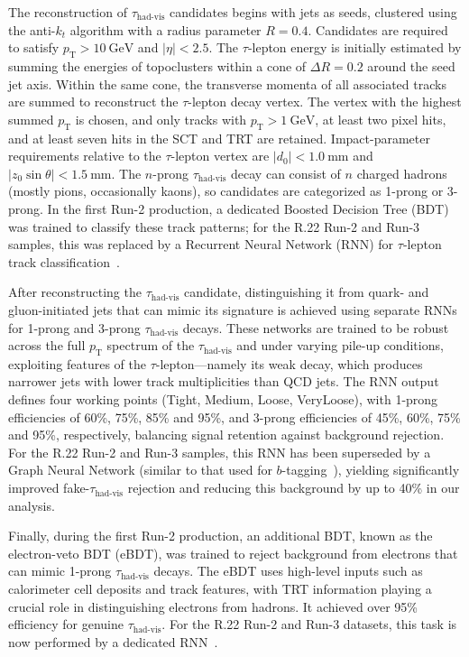 The reconstruction of \(\tau_{\text{had-vis}}\) candidates begins with jets as seeds, clustered using the anti-\(k_{t}\) algorithm with a radius parameter \(R = 0.4\).  Candidates are required to satisfy \(p_{\text{T}} > 10\ \mathrm{GeV}\) and \(|\eta| < 2.5\).  The \(\tau\)-lepton energy is initially estimated by summing the energies of topoclusters within a cone of \(\Delta R = 0.2\) around the seed jet axis.  Within the same cone, the transverse momenta of all associated tracks are summed to reconstruct the \(\tau\)-lepton decay vertex.  
The vertex with the highest summed \(p_{\text{T}}\) is chosen, and only tracks with \(p_{\text{T}} > 1\ \mathrm{GeV}\), at least two pixel hits, and at least seven hits in the SCT and TRT are retained.  Impact-parameter requirements relative to the \(\tau\)-lepton vertex are \(|d_{0}| < 1.0\ \mathrm{mm}\) and \(|z_{0}\sin\theta| < 1.5\ \mathrm{mm}.\)
The \(n\)-prong \(\tau_{\text{had-vis}}\) decay can consist of \(n\) charged hadrons (mostly pions, occasionally kaons), so candidates are categorized as 1-prong or 3-prong.  In the first Run-2 production, a dedicated Boosted Decision Tree (BDT) was trained to classify these track patterns; for the R.22 Run-2 and Run-3 samples, this was replaced by a Recurrent Neural Network (RNN) for \(\tau\)-lepton track classification~\cite{ATL-PHYS-PUB-2022-044}.  

After reconstructing the \(\tau_{\text{had-vis}}\) candidate, distinguishing it from quark- and gluon-initiated jets that can mimic its signature is achieved using separate RNNs for 1-prong and 3-prong \(\tau_{\text{had-vis}}\) decays.  These networks are trained to be robust across the full \(p_{\text{T}}\) spectrum of the \(\tau_{\text{had-vis}}\) and under varying pile-up conditions, exploiting features of the \(\tau\)-lepton—namely its weak decay, which produces narrower jets with lower track multiplicities than QCD jets.  
The RNN output defines four working points (Tight, Medium, Loose, VeryLoose), with 1-prong efficiencies of 60\%, 75\%, 85\% and 95\%, and 3-prong efficiencies of 45\%, 60\%, 75\% and 95\%, respectively, balancing signal retention against background rejection.  For the R.22 Run-2 and Run-3 samples, this RNN has been superseded by a Graph Neural Network (similar to that used for \(b\)-tagging~\cite{new_tagging}), yielding significantly improved fake-\(\tau_{\text{had-vis}}\) rejection and reducing this background by up to 40\% in our analysis.  

Finally, during the first Run-2 production, an additional BDT, known as the electron-veto BDT (eBDT), was trained to reject background from electrons that can mimic 1-prong \(\tau_{\text{had-vis}}\) decays.  The eBDT uses high-level inputs such as calorimeter cell deposits and track features, with TRT information playing a crucial role in distinguishing electrons from hadrons.  It achieved over 95\% efficiency for genuine \(\tau_{\text{had-vis}}\).  For the R.22 Run-2 and Run-3 datasets, this task is now performed by a dedicated RNN~\cite{ATL-PHYS-PUB-2022-044}.

